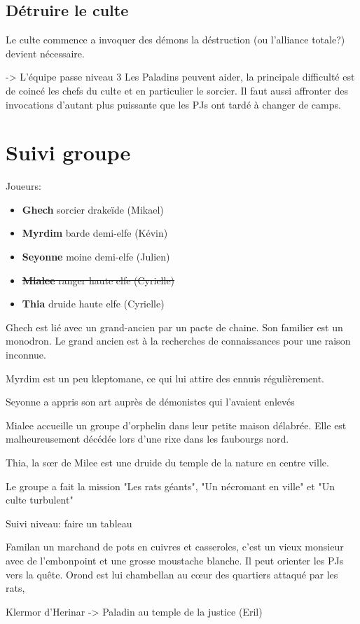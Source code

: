 \subsection{Détruire le culte}

Le culte commence a invoquer des démons la déstruction (ou l'alliance totale?) devient nécessaire.

 -> L'équipe passe niveau 3
Les Paladins peuvent aider, la principale difficulté est de coincé les chefs du culte et en particulier
le sorcier. Il faut aussi affronter des invocations d'autant plus puissante que les PJs ont tardé à changer
de camps. 



\section{Suivi groupe}

Joueurs:
\begin{itemize}
  \item {\bf Ghech} sorcier drakeïde (Mikael)
  \item {\bf Myrdim} barde demi-elfe (Kévin)
  \item {\bf Seyonne} moine demi-elfe (Julien)
  \item \sout{{\bf Mialee} ranger haute elfe (Cyrielle)}
  \item {\bf Thia} druide haute elfe (Cyrielle)
\end{itemize}

Ghech est lié avec un grand-ancien par un pacte de chaine. Son familier est un 
monodron. Le grand ancien est à la recherches de connaissances pour une raison
inconnue.

Myrdim est un peu kleptomane, ce qui lui attire des ennuis régulièrement.

Seyonne a appris son art auprès de démonistes qui l'avaient enlevés

Mialee accueille un groupe d'orphelin dans leur petite maison délabrée. Elle
est malheureusement décédée lors d'une rixe dans les faubourgs nord.

Thia, la s\oe{}r de Milee est une druide du temple de la nature en centre ville.

Le groupe a fait la mission "Les rats géants", "Un nécromant en ville" et "Un culte turbulent"

Suivi niveau: faire un tableau

Familan un marchand de pots en cuivres et 
casseroles, c'est un vieux monsieur avec de l'embonpoint et une grosse 
moustache blanche. Il peut orienter les PJs vers la quête.
Orond est lui chambellan au c\oe{}ur des quartiers attaqué par les rats,

Klermor d'Herinar -> Paladin au temple de la justice (Eril)



